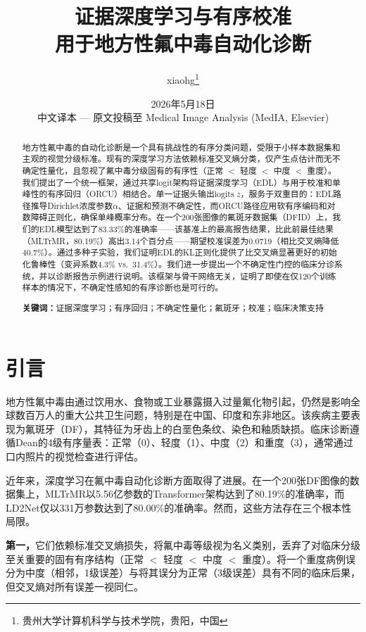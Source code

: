 \documentclass[12pt,a4paper]{ctexart}
\title{\textbf{证据深度学习与有序校准\\用于地方性氟中毒自动化诊断}}
\author{xiaohg\thanks{贵州大学计算机科学与技术学院，贵阳，中国}}
\date{2026年5月18日\\\vspace{0.5cm}\small 中文译本 — 原文投稿至 Medical Image Analysis (MedIA, Elsevier)}
\begin{document}
\maketitle

\renewcommand{\abstractname}{摘要}
\begin{abstract}
地方性氟中毒的自动化诊断是一个具有挑战性的有序分类问题，受限于小样本数据集和主观的视觉分级标准。现有的深度学习方法依赖标准交叉熵分类，仅产生点估计而无不确定性量化，且忽视了氟中毒分级固有的有序性（正常 $<$ 轻度 $<$ 中度 $<$ 重度）。我们提出了一个统一框架，通过共享logit架构将证据深度学习（EDL）与用于校准和单峰性的有序回归（ORCU）相结合。单一证据头输出$\mathrm{logits}\; z$，服务于双重目的：EDL路径推导Dirichlet浓度参数$\alpha$、证据和预测不确定性，而ORCU路径应用软有序编码和对数障碍正则化，确保单峰概率分布。在一个200张图像的氟斑牙数据集（DFID）上，我们的EDL模型达到了83.33\%的准确率——该基准上的最高报告结果，比此前最佳结果（MLTrMR，80.19\%）高出3.14个百分点——期望校准误差为0.0719（相比交叉熵降低40.7\%）。通过多种子实验，我们证明EDL的KL正则化提供了比交叉熵显著更好的初始化鲁棒性（变异系数4.3\% vs.\ 31.4\%）。我们进一步提出一个不确定性门控的临床分诊系统，并以诊断报告示例进行说明。该框架与骨干网络无关，证明了即使在仅120个训练样本的情况下，不确定性感知的有序诊断也是可行的。

\vspace{6pt}
\textbf{关键词：}证据深度学习；有序回归；不确定性量化；氟斑牙；校准；临床决策支持
\end{abstract}

\section{引言}

地方性氟中毒由通过饮用水、食物或工业暴露摄入过量氟化物引起，仍然是影响全球数百万人的重大公共卫生问题，特别是在中国、印度和东非地区\cite{gu2024zunyi,wei2019pathogenesis}。该疾病主要表现为氟斑牙（DF），其特征为牙齿上的白垩色条纹、染色和釉质缺损\cite{fejerskov1988dental,denbesten2011biological}。临床诊断遵循Dean的4级有序量表：正常（0）、轻度（1）、中度（2）和重度（3）\cite{dean1942fluorosis}，通常通过口内照片的视觉检查进行评估\cite{schwendicke2021deep}。

近年来，深度学习在氟中毒自动化诊断方面取得了进展。在一个200张DF图像的数据集上，MLTrMR以5.56亿参数的Transformer架构达到了80.19\%的准确率\cite{xu2025mltrmr}，而LD2Net仅以331万参数达到了80.00\%的准确率\cite{li2026ld2net}。然而，这些方法存在三个根本性局限。

\textbf{第一，}它们依赖标准交叉熵损失，将氟中毒等级视为名义类别，丢弃了对临床分级至关重要的固有有序结构（正常 $<$ 轻度 $<$ 中度 $<$ 重度）。将一个重度病例误分为中度（相邻，1级误差）与将其误分为正常（3级误差）具有不同的临床后果，但交叉熵对所有误差一视同仁。
\end{document}
